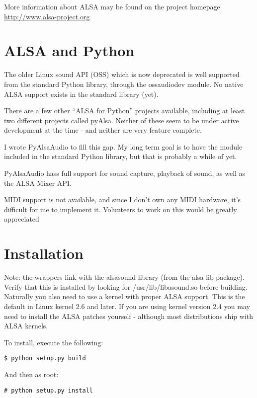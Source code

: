 \documentclass{howto}
\begin{document}
More information about ALSA may be found on the project homepage 
\url{http://www.alsa-project.org}

\section{ALSA and Python}

The older Linux sound API (OSS) which is now deprecated is well supported 
from the standard Python library, through the ossaudiodev module. No native
ALSA support exists in the standard library (yet).

There are a few other ``ALSA for Python'' projects available, including at
least two different projects called pyAlsa. Neither of these seem to be under
active development at the time - and neither are very feature complete.

I wrote PyAlsaAudio to fill this gap. My long term goal is to have the module
included in the standard Python library, but that is probably a while of yet.

PyAlsaAudio hass full support for sound capture, playback of sound, as well as
the ALSA Mixer API.

MIDI support is not available, and since I don't own any MIDI hardware, it's
difficult for me to implement it. Volunteers to work on this would be greatly
appreciated
\section{Installation}

Note: the wrappers link with the alsasound library (from the alsa-lib
package). Verify that this is installed by looking for /usr/lib/libasound.so
before building. Naturally you also need to use a kernel with proper ALSA
support. This is the default in Linux kernel 2.6 and later. If you are using
kernel version 2.4 you may need to install the ALSA patches yourself - although
most distributions ship with ALSA kernels.

To install, execute the following: \\
\begin{verbatim}
$ python setup.py build
\end{verbatim}

And then as root: \\
\begin{verbatim}
# python setup.py install
\end{verbatim}


\end{document}
